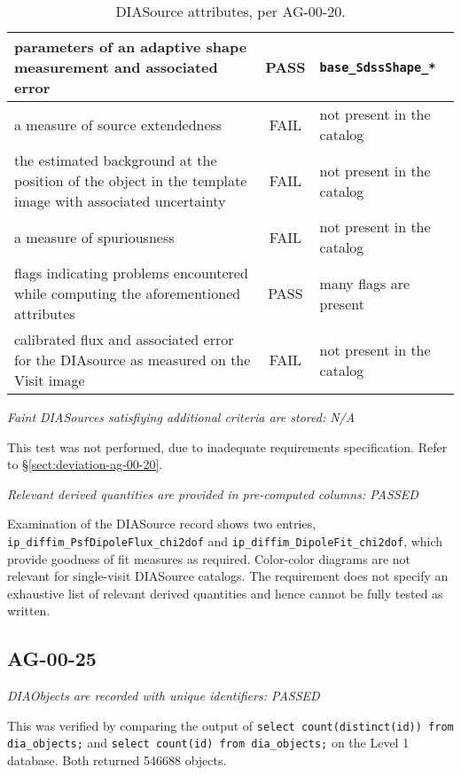 \documentclass[DM,lsstdraft,STR,toc]{lsstdoc}
\begin{document}
\begin{table}[h]
\begin{tabular}{|p{}|c|p{}|}
        \hline
        parameters of an adaptive shape measurement and associated error & PASS & \texttt{base\_SdssShape\_*} \\
        \hline
        a measure of source extendedness & FAIL & not present in the catalog \\
        \hline
        the estimated background at the position of the object in the template image with associated uncertainty & FAIL & not present in the catalog \\
        \hline
        a measure of spuriousness & FAIL &  not present in the catalog \\
        \hline
        flags indicating problems encountered while computing the aforementioned attributes & PASS & many flags are present \\
        \hline
        calibrated flux and associated error for the DIAsource as measured on the Visit image & FAIL & not present in the catalog \\
        \hline
    \end{tabular}
    \caption{DIASource attributes, per AG-00-20. \label{tab:diasrc}}
\end{table}

\textit{Faint DIASources satisfiying additional criteria are stored: N/A}

This test was not performed, due to inadequate requirements specification. Refer to \S\ref{sect:deviation-ag-00-20}.

\textit{Relevant derived quantities are provided in pre-computed columns: PASSED}

Examination of the DIASource record shows two entries,
\texttt{ip\_diffim\_PsfDipoleFlux\_chi2dof} and
\texttt{ip\_diffim\_DipoleFit\_chi2dof}, which provide goodness of fit measures
as required.  Color-color diagrams are not relevant for single-visit DIASource
catalogs. The requirement does not specify an exhaustive list of relevant
derived quantities and hence cannot be fully tested as written.

\subsection{AG-00-25}
\label{sect:ag-00-25}

\textit{DIAObjects are recorded with unique identifiers: PASSED}

This was verified by comparing the output of \texttt{select count(distinct(id))
from dia\_objects;} and \texttt{select count(id) from dia\_objects;} on the
Level 1 database. Both returned 546688 objects.
\end{document}
